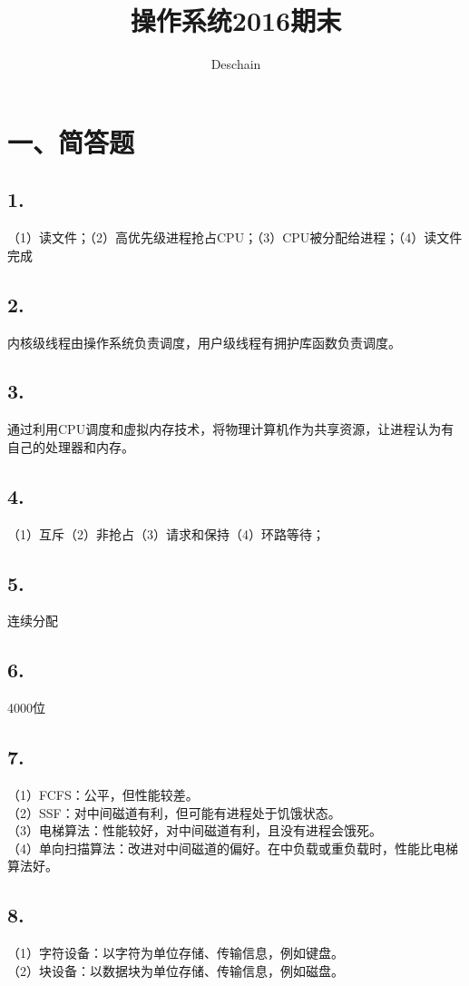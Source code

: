 \documentclass[UTF8]{ctexart}
\title{操作系统2016期末}
\author{Deschain}
\begin{document}
\maketitle
\section*{一、简答题}
\subsection*{1.}
（1）读文件；（2）高优先级进程抢占CPU；（3）CPU被分配给进程；（4）读文件完成
\subsection*{2.}
内核级线程由操作系统负责调度，用户级线程有拥护库函数负责调度。
\subsection*{3.}
通过利用CPU调度和虚拟内存技术，将物理计算机作为共享资源，让进程认为有自己的处理器和内存。
\subsection*{4.}
（1）互斥（2）非抢占（3）请求和保持（4）环路等待；
\subsection*{5.}
连续分配
\subsection*{6.}
4000位
\subsection*{7.}
（1）FCFS：公平，但性能较差。\\
（2）SSF：对中间磁道有利，但可能有进程处于饥饿状态。\\
（3）电梯算法：性能较好，对中间磁道有利，且没有进程会饿死。\\
（4）单向扫描算法：改进对中间磁道的偏好。在中负载或重负载时，性能比电梯算法好。\\
\subsection*{8.}
（1）字符设备：以字符为单位存储、传输信息，例如键盘。\\
（2）块设备：以数据块为单位存储、传输信息，例如磁盘。\\
\end{document}
